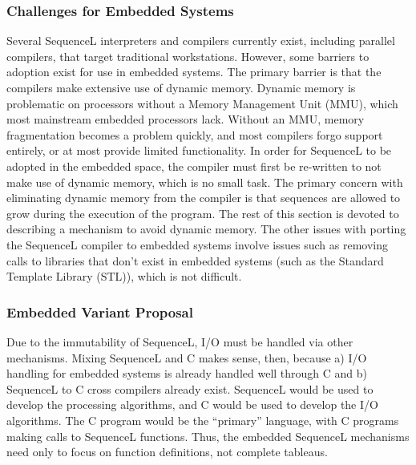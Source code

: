 \subsubsection{Challenges for Embedded Systems}\label{sec:conclusions:future_work:sequencel:embedded_challenges}

Several SequenceL interpreters and compilers currently exist, including parallel compilers, that target traditional workstations. However, some barriers to adoption exist for use in embedded systems. The primary barrier is that the compilers make extensive use of dynamic memory. Dynamic memory is problematic on processors without a Memory Management Unit (MMU), which most mainstream embedded processors lack. Without an MMU, memory fragmentation becomes a problem quickly, and most compilers forgo support entirely, or at most provide limited functionality. In order for SequenceL to be adopted in the embedded space, the compiler must first be re-written to not make use of dynamic memory, which is no small task. The primary concern with eliminating dynamic memory from the compiler is that sequences are allowed to grow during the execution of the program. The rest of this section is devoted to describing a mechanism to avoid dynamic memory. The other issues with porting the SequenceL compiler to embedded systems involve issues such as removing calls to libraries that don't exist in embedded systems (such as the Standard Template Library (STL)), which is not difficult.

\subsubsection{Embedded Variant Proposal}\label{sec:conclusions:future_work:sequencel:embedded_variant}

Due to the immutability of SequenceL, I/O must be handled via other mechanisms. Mixing SequenceL and C makes sense, then, because a) I/O handling for embedded systems is already handled well through C and b) SequenceL to C cross compilers already exist. SequenceL would be used to develop the processing algorithms, and C would be used to develop the I/O algorithms. The C program would be the ``primary'' language, with C programs making calls to SequenceL functions. Thus, the embedded SequenceL mechanisms need only to focus on function definitions, not complete tableaus.

